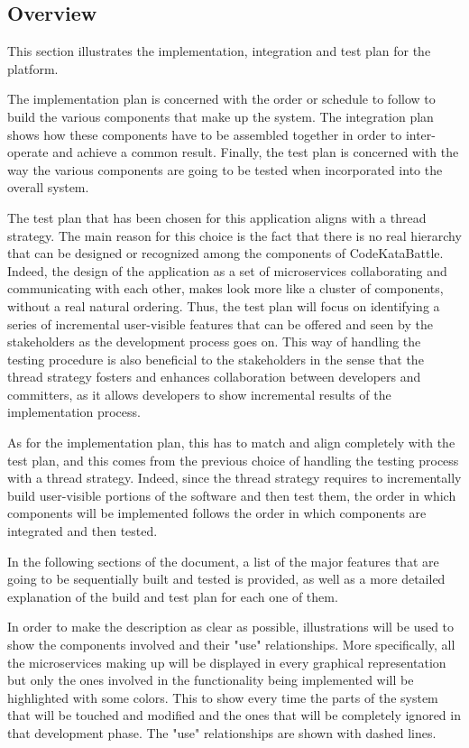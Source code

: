 \subsection{Overview}
This section illustrates the implementation, integration and test plan for the \app platform. 

The implementation plan is concerned with the order or schedule to follow to build the various components that make up the system. The integration plan shows how these components have to be assembled together in order to inter-operate and achieve a common result. Finally, the test plan is concerned with the way the various components are going to be tested when incorporated into the overall system.

The test plan that has been chosen for this application aligns with a thread strategy. The main reason for this choice is the fact that there is no real hierarchy that can be designed or recognized among the components of CodeKataBattle. Indeed, the design of the application as a set of microservices collaborating and communicating with each other, makes \app look more like a cluster of components, without a real natural ordering.
Thus, the test plan will focus on identifying a series of incremental user-visible features that can be offered and seen by the stakeholders as the development process goes on.
This way of handling the testing procedure is also beneficial to the stakeholders in the sense that the thread strategy fosters and enhances collaboration between developers and committers, as it allows developers to show incremental results of the implementation process.

As for the implementation plan, this has to match and align completely with the test plan, and this comes from the previous choice of handling the testing process with a thread strategy. 
Indeed, since the thread strategy requires to incrementally build user-visible portions of the software and then test them, the order in which components will be implemented follows the order in which components are integrated and then tested.

In the following sections of the document, a list of the major features that are going to be sequentially built and tested is provided, as well as a more detailed explanation of the build and test plan for each one of them.

In order to make the description as clear as possible, illustrations will be used to show the components involved and their "use" relationships. More specifically, all the microservices making up \app will be displayed in every graphical representation but only the ones involved in the functionality being implemented will be highlighted with some colors. This to show every time the parts of the system that will be touched and modified and the ones that will be completely ignored in that development phase. The "use" relationships are shown with dashed lines.


